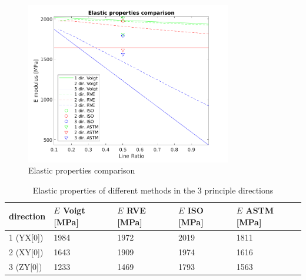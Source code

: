 \begin{figure}[H]
    \centering
    \includegraphics[width=0.80\textwidth]{chapter_6_Elasticmodelling/figures/Elasticproperties.png}
    \caption{Elastic properties comparison}
    \label{fig:Elasticproperties}
\end{figure}
\begin{table}
\caption{Elastic properties of different methods in the 3 principle directions}
\begin{tabular}{p{2.2cm}p{2.2cm}p{2.2cm}p{2.2cm}p{2.2cm}}
 \hline
direction & $E$ Voigt [MPa] & $E$ RVE [MPa]& $E$ ISO [MPa]& $E$ ASTM [MPa] \\ 
\hline
1 (YX[0]) & 1984 & 1972 & 2019 & 1811 \\
2 (XY[0]) & 1643 & 1909 & 1974 & 1616 \\
3 (ZY[0]) & 1233 & 1469 & 1793 & 1563 \\
 \hline
\end{tabular}
     \label{tab:Elasticproperties}
\end{table}


